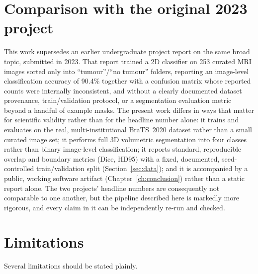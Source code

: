 \section{Comparison with the original 2023 project}

This work supersedes an earlier undergraduate project report on the same broad
topic, submitted in 2023. That report trained a 2D classifier on 253 curated MRI
images sorted only into ``tumour''/``no tumour'' folders, reporting an
image-level classification accuracy of 90.4\% together with a confusion matrix
whose reported counts were internally inconsistent, and without a clearly
documented dataset provenance, train/validation protocol, or a segmentation
evaluation metric beyond a handful of example masks. The present work differs
in ways that matter for scientific validity rather than for the headline
number alone: it trains and evaluates on the real, multi-institutional
BraTS~2020 dataset rather than a small curated image set; it performs full 3D
volumetric segmentation into four classes rather than binary image-level
classification; it reports standard, reproducible overlap and boundary metrics
(Dice, HD95) with a fixed, documented, seed-controlled train/validation split
(Section~\ref{sec:data}); and it is accompanied by a public, working software
artifact (Chapter~\ref{ch:conclusion}) rather than a static report alone. The
two projects' headline numbers are consequently not comparable to one another,
but the pipeline described here is markedly more rigorous, and every claim in
it can be independently re-run and checked.

\section{Limitations}

Several limitations should be stated plainly.

